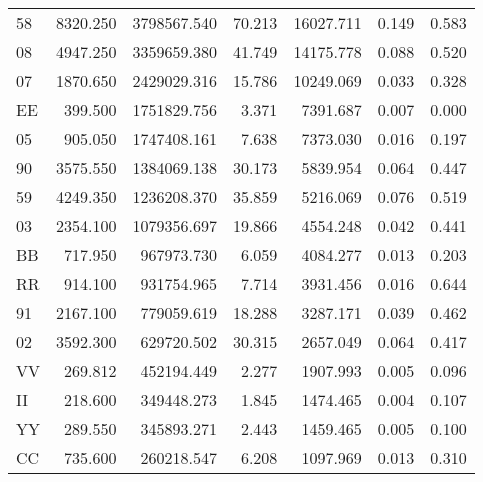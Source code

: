 \begin{tabular}{lrrrrrr}
          58 &        8320.250 &      3798567.540 &      70.213 &            16027.711 &        0.149 &                 0.583 \\
          08 &        4947.250 &      3359659.380 &      41.749 &            14175.778 &        0.088 &                 0.520 \\
          07 &        1870.650 &      2429029.316 &      15.786 &            10249.069 &        0.033 &                 0.328 \\
          EE &         399.500 &      1751829.756 &       3.371 &             7391.687 &        0.007 &                 0.000 \\
          05 &         905.050 &      1747408.161 &       7.638 &             7373.030 &        0.016 &                 0.197 \\
          90 &        3575.550 &      1384069.138 &      30.173 &             5839.954 &        0.064 &                 0.447 \\
          59 &        4249.350 &      1236208.370 &      35.859 &             5216.069 &        0.076 &                 0.519 \\
          03 &        2354.100 &      1079356.697 &      19.866 &             4554.248 &        0.042 &                 0.441 \\
          BB &         717.950 &       967973.730 &       6.059 &             4084.277 &        0.013 &                 0.203 \\
          RR &         914.100 &       931754.965 &       7.714 &             3931.456 &        0.016 &                 0.644 \\
          91 &        2167.100 &       779059.619 &      18.288 &             3287.171 &        0.039 &                 0.462 \\
          02 &        3592.300 &       629720.502 &      30.315 &             2657.049 &        0.064 &                 0.417 \\
          VV &         269.812 &       452194.449 &       2.277 &             1907.993 &        0.005 &                 0.096 \\
          II &         218.600 &       349448.273 &       1.845 &             1474.465 &        0.004 &                 0.107 \\
          YY &         289.550 &       345893.271 &       2.443 &             1459.465 &        0.005 &                 0.100 \\
          CC &         735.600 &       260218.547 &       6.208 &             1097.969 &        0.013 &                 0.310 \\

\end{tabular}
